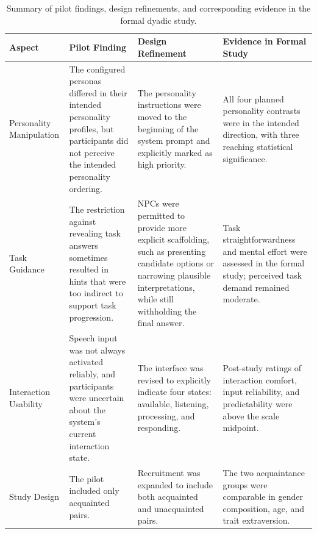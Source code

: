 \documentclass[a4paper,fleqn]{cas-sc}
\begin{document}
\begin{table}[t]
\centering
\caption{Summary of pilot findings, design refinements, and corresponding evidence in the formal dyadic study.}
\label{tab:pilot_summary}
\begin{tabular}{p{} p{} p{} p{}}
\toprule
\textbf{Aspect} &
\textbf{Pilot Finding} &
\textbf{Design Refinement} &
\textbf{Evidence in Formal Study} \\
\midrule

Personality Manipulation
&
The configured personas differed in their intended personality profiles, but participants did not perceive the intended personality ordering.
&
The personality instructions were moved to the beginning of the system prompt and explicitly marked as high priority.
&
All four planned personality contrasts were in the intended direction, with three reaching statistical significance.
\\

\addlinespace

Task Guidance
&
The restriction against revealing task answers sometimes resulted in hints that were too indirect to support task progression.
&
NPCs were permitted to provide more explicit scaffolding, such as presenting candidate options or narrowing plausible interpretations, while still withholding the final answer.
&
Task straightforwardness and mental effort were assessed in the formal study; perceived task demand remained moderate.
\\

\addlinespace

Interaction Usability
&
Speech input was not always activated reliably, and participants were uncertain about the system's current interaction state.
&
The interface was revised to explicitly indicate four states: available, listening, processing, and responding.
&
Post-study ratings of interaction comfort, input reliability, and predictability were above the scale midpoint.
\\

\addlinespace

Study Design
&
The pilot included only acquainted pairs.
&
Recruitment was expanded to include both acquainted and unacquainted pairs.
&
The two acquaintance groups were comparable in gender composition, age, and trait extraversion.
\\

\bottomrule
\end{tabular}
\end{table}
\end{document}
